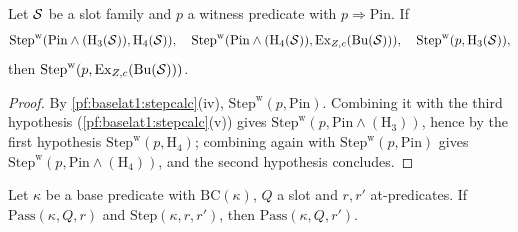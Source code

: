 \begin{lemma}\label{pf:baselat1:stepWbuilt}
Let $\mathcal S$ be a slot family and $p$ a witness predicate with $p\Rightarrow\mathrm{Pin}$. If
\[
\mathrm{Step}^{\mathrm w}(\mathrm{Pin}\wedge(\mathrm{H}_3(\mathcal S)),\mathrm{H}_4(\mathcal S)),\quad
\mathrm{Step}^{\mathrm w}(\mathrm{Pin}\wedge(\mathrm{H}_4(\mathcal S)),\mathrm{Ex}_{Z,c}(\mathrm{Bu}(\mathcal S))),\quad
\mathrm{Step}^{\mathrm w}(p,\mathrm{H}_3(\mathcal S)),
\]
then $\mathrm{Step}^{\mathrm w}(p,\mathrm{Ex}_{Z,c}(\mathrm{Bu}(\mathcal S)))$.
\end{lemma}

\begin{proof}
By \cref{pf:baselat1:stepcalc}(iv), $\mathrm{Step}^{\mathrm w}(p,\mathrm{Pin})$. Combining it with the third
hypothesis (\cref{pf:baselat1:stepcalc}(v)) gives $\mathrm{Step}^{\mathrm w}(p,\mathrm{Pin}\wedge(\mathrm{H}_3))$, hence
by the first hypothesis $\mathrm{Step}^{\mathrm w}(p,\mathrm{H}_4)$; combining again with $\mathrm{Step}^{\mathrm w}(p,\mathrm{Pin})$
gives $\mathrm{Step}^{\mathrm w}(p,\mathrm{Pin}\wedge(\mathrm{H}_4))$, and the second hypothesis concludes.
\end{proof}

\begin{proposition}\label{pf:baselat1:passstep}
Let $\kappa$ be a base predicate with $\mathrm{BC}(\kappa)$, $Q$ a slot and $r,r'$ at-predicates. If
$\mathrm{Pass}(\kappa,Q,r)$ and $\mathrm{Step}(\kappa,r,r')$, then $\mathrm{Pass}(\kappa,Q,r')$.
\end{proposition}

